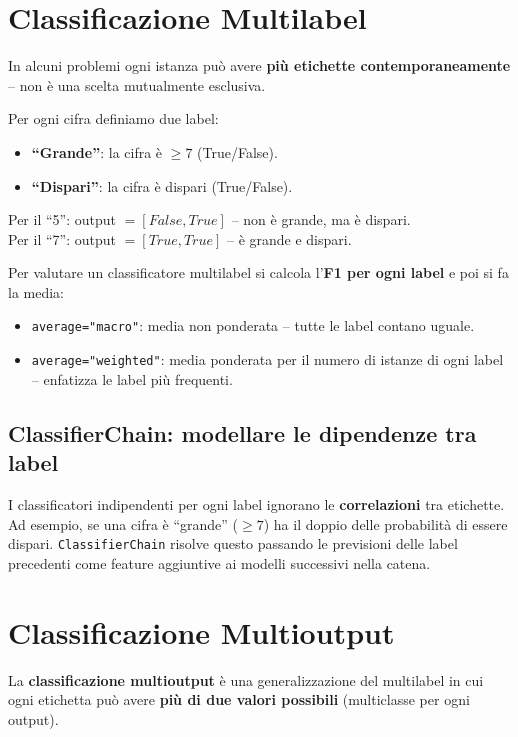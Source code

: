 \section{Classificazione Multilabel}
In alcuni problemi ogni istanza può avere \textbf{più etichette contemporaneamente} -- non è una scelta mutualmente esclusiva.

\begin{exbox}
Per ogni cifra definiamo due label:
\begin{itemize}
    \item \textbf{``Grande''}: la cifra è $\geq 7$ (True/False).
    \item \textbf{``Dispari''}: la cifra è dispari (True/False).
\end{itemize}
Per il ``5'': output $= [False, True]$ -- non è grande, ma è dispari.\\
Per il ``7'': output $= [True, True]$ -- è grande e dispari.
\end{exbox}

Per valutare un classificatore multilabel si calcola l'\textbf{F1 per ogni label} e poi si fa la media:
\begin{itemize}
    \item \texttt{average="macro"}: media non ponderata -- tutte le label contano uguale.
    \item \texttt{average="weighted"}: media ponderata per il numero di istanze di ogni label -- enfatizza le label più frequenti.
\end{itemize}

\subsection{ClassifierChain: modellare le dipendenze tra label}

I classificatori indipendenti per ogni label ignorano le \textbf{correlazioni} tra etichette. Ad esempio, se una cifra è ``grande'' ($\geq 7$) ha il doppio delle probabilità di essere dispari. \texttt{ClassifierChain} risolve questo passando le previsioni delle label precedenti come feature aggiuntive ai modelli successivi nella catena.

\section{Classificazione Multioutput}

La \textbf{classificazione multioutput} è una generalizzazione del multilabel in cui ogni etichetta può avere \textbf{più di due valori possibili} (multiclasse per ogni output).

